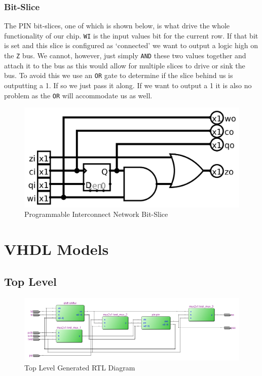 \documentclass{article}
\begin{document}
        \subsubsection{Bit-Slice}
        The PIN bit-slices, one of which is shown below, is what drive the
        whole functionality of our chip. \texttt{WI} is the input values bit
        for the current row. If that bit is set and this slice is configured as
        `connected' we want to output a logic high on the \texttt{Z} bus. We
        cannot, however, just simply \texttt{AND} these two values together and
        attach it to the bus as this would allow for multiple slices to drive
        or sink the bus. To avoid this we use an \texttt{OR} gate to determine
        if the slice behind us is outputting a 1. If so we just pass it along.
        If we want to output a 1 it is also no problem as the \texttt{OR} will
        accommodate us as well.
        \begin{figure}[H]
            \centering
            \includegraphics[width=0.75\linewidth]{../../logisim/pin_slice.png}
            \caption{Programmable Interconnect Network Bit-Slice}
        \end{figure}


\section{VHDL Models}
    \subsection{Top Level}
        
        \begin{figure}[H]
            \centering
            \includegraphics[width=\linewidth]{../../doc/rtl_pics/top_rtl.png}
            \caption{Top Level Generated RTL Diagram}
        \end{figure}
\end{document}
